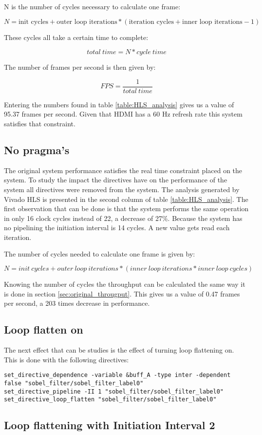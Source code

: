 N is the number of cycles necessary to calculate one frame:


\[
N =  \text{init cycles} + \text{outer loop iterations} * ( \text{iteration cycles} + \text{inner loop iterations} - 1)
\]


These cycles all take a certain time to complete:

\[
total\ time = N * cycle\ time
\]

The number of frames per second is then given by:

\[
FPS = \frac{1}{total\ time}
\]

Entering the numbers found in table \ref{table:HLS_analysis} gives us a value of 95.37 frames per second. Given that HDMI has a 60 Hz refresh rate this system satisfies that constraint.


\subsection{No pragma's}

The original system performance satisfies the real time constraint placed on the system. To study the impact the directives have on the performance of the system all directives were removed from the  system. The analysis generated by Vivado HLS is presented in the second column of table \ref{table:HLS_analysis}. The first observation that can be done is that the system performs the same operation in only 16 clock cycles instead of 22, a decrease of 27\%. Because the system has no pipelining the initiation interval is 14 cycles. A new value gets read each iteration.

The number of cycles needed to calculate one frame is given by:

\[
N = init\ cycles + outer\ loop\ iterations * (inner\ loop\ iterations * inner\ loop\ cycles) 
\]


Knowing the number of cycles the throughput can be calculated the same way it is done in section \ref{sec:original_througput}. This gives us a value of 0.47 frames per second, a 203 times decrease in performance.

\subsection{Loop flatten on}

The next effect that can be studies is the effect of turning loop flattening on. This is done with the following directives:

\begin{scriptsize}
\begin{verbatim}
set_directive_dependence -variable &buff_A -type inter -dependent false "sobel_filter/sobel_filter_label0"
set_directive_pipeline -II 1 "sobel_filter/sobel_filter_label0"
set_directive_loop_flatten "sobel_filter/sobel_filter_label0"
\end{verbatim}
\end{scriptsize}

\subsection{Loop flattening with Initiation Interval 2}







